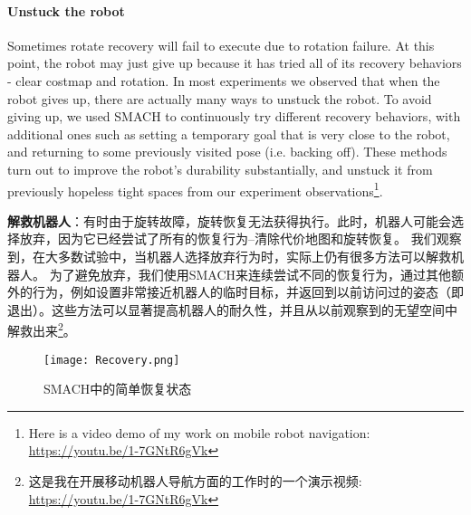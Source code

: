 \paragraph{Unstuck the robot} Sometimes rotate recovery will fail to execute due to rotation failure. At this point, the robot may just give up because it has tried all of its recovery behaviors - clear costmap and rotation. In most experiments we observed that when the robot gives up, there are actually many ways to unstuck the robot. 
To avoid giving up, we used SMACH to continuously try different recovery behaviors, with additional ones such as setting a temporary goal that is very close to the robot, and returning to some previously visited pose (i.e. backing off). These methods turn out to improve the robot's durability substantially, and unstuck it from previously hopeless tight spaces from our experiment observations\footnote{Here is a video demo of my work on mobile robot navigation: \url{https://youtu.be/1-7GNtR6gVk}}.

\textbf{解救机器人}：有时由于旋转故障，旋转恢复无法获得执行。此时，机器人可能会选择放弃，因为它已经尝试了所有的恢复行为--清除代价地图和旋转恢复。
我们观察到，在大多数试验中，当机器人选择放弃行为时，实际上仍有很多方法可以解救机器人。
为了避免放弃，我们使用SMACH来连续尝试不同的恢复行为，通过其他额外的行为，例如设置非常接近机器人的临时目标，并返回到以前访问过的姿态（即退出）。这些方法可以显著提高机器人的耐久性，并且从以前观察到的无望空间中解救出来\footnote{这是我在开展移动机器人导航方面的工作时的一个演示视频: \url{https://youtu.be/1-7GNtR6gVk}}。

\begin{figure}[!h]
	\begin{center}
		\texttt{[image: Recovery.png]} 
		\caption{SMACH中的简单恢复状态}
	\end{center}
\end{figure}



